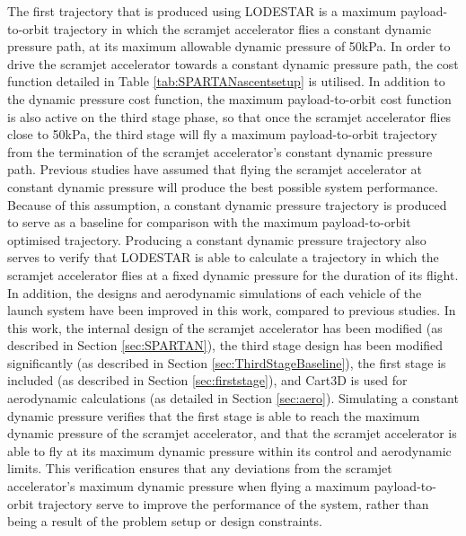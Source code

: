 The first trajectory that is produced using LODESTAR is a maximum payload-to-orbit trajectory in which the scramjet accelerator flies a constant dynamic pressure path, at its maximum allowable dynamic pressure of 50kPa. In order to drive the scramjet accelerator towards a constant dynamic pressure path, the cost function detailed in Table \ref{tab:SPARTANascentsetup} is utilised. In addition to the dynamic pressure cost function, the maximum payload-to-orbit cost function is also active on the third stage phase, so that once the scramjet accelerator flies close to 50kPa, the third stage will fly a maximum payload-to-orbit trajectory from the termination of the scramjet accelerator's constant dynamic pressure path.
Previous studies have assumed that flying the scramjet accelerator at constant dynamic pressure will produce the best possible system performance\cite{Preller2017b}. Because of this assumption, a constant dynamic pressure trajectory is produced to serve as a baseline for comparison with the maximum payload-to-orbit optimised trajectory. Producing a constant dynamic pressure trajectory also serves to verify that LODESTAR is able to calculate a trajectory in which the scramjet accelerator flies at a fixed dynamic pressure for the duration of its flight. 
In addition, the designs and aerodynamic simulations of each vehicle of the launch system have been improved in this work, compared to previous studies\cite{Preller2017b}. In this work, the internal design of the scramjet accelerator has been modified (as described in Section \ref{sec:SPARTAN}), the third stage design has been modified significantly (as described in Section \ref{sec:ThirdStageBaseline}), the first stage is included (as described in Section \ref{sec:firststage}), and Cart3D\cite{CART3D} is used for aerodynamic calculations (as detailed in Section \ref{sec:aero}). Simulating a constant dynamic pressure verifies that the first stage is able to reach the maximum dynamic pressure of the scramjet accelerator, and that the scramjet accelerator is able to fly at its maximum dynamic pressure within its control and aerodynamic limits. This verification ensures that any deviations from the scramjet accelerator's maximum dynamic pressure when flying a maximum payload-to-orbit trajectory serve to improve the performance of the system, rather than being a result of the problem setup or design constraints. 

